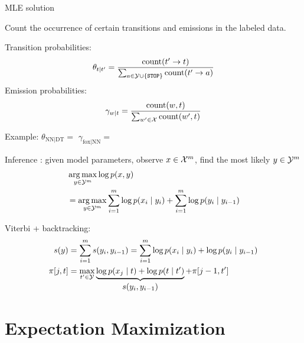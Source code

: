 \documentclass[usenames,dvipsnames,notes,11pt,aspectratio=169]{beamer}
\begin{document}
\begin{frame}
    {MLE solution}

    Count the occurrence of certain transitions and emissions in the labeled data.

    Transition probabilities:
    $$
    \theta_{t\mid t'} = \frac{\text{count}(t'\rightarrow t)}
    {\sum_{a\in\mathcal{Y}\cup\left\{ \texttt{STOP} \right\}}\text{count}(t'\rightarrow a)}
    $$
    Emission probabilities:
    $$
    \gamma_{w\mid t} = \frac{\text{count}(w,t)}
    {\sum_{w'\in\mathcal{X}}\text{count}(w',t)}
    $$

    Example: $\theta_{\text{NN}\mid\text{DT}}=$
        \hspace{3cm} $\gamma_{\text{fox}\mid\text{NN}}=$
\end{frame}

\begin{frame}
    {Inference}
    : given model parameters, observe $x\in\mathcal{X}^m$, find the most likely $y\in\mathcal{Y}^m$
    \begin{align*}
        &\operatorname*{arg\,max}_{y\in\mathcal{Y}^m} \log p(x,y) \\
        &= \operatorname*{arg\,max}_{y\in\mathcal{Y}^m} \sum_{i=1}^m \log p(x_i\mid y_i)
        + \sum_{i=1}^m \log p(y_i\mid y_{i-1})
    \end{align*}

    Viterbi + backtracking:
    \begin{align*}
        s(y) &= \sum_{i=1}^m s(y_i, y_{i-1}) = \sum_{i=1}^m \log p(x_i\mid y_i) + \log p(y_i\mid y_{i-1})\\
        \pi[j, t] &= \max_{t'\in\mathcal{Y}}
            \underbrace{\log p(x_j\mid t) + \log p(t\mid t')}_{\textstyle s(y_i, y_{i-1})}
            + \pi[j-1, t'] 
    \end{align*}
\end{frame}

\section{Expectation Maximization}
\end{document}
